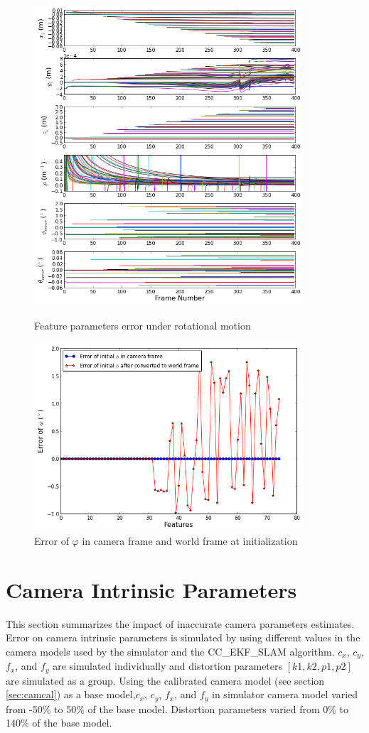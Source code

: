 \begin{figure}[h]
  \centering
  \includegraphics[width=10cm, height=12cm]{./Figures/SimulationFigures/Figure25.png}
  \caption{Feature parameters error under rotational motion}
  \label{fig:simfig25}
\end{figure}

\begin{figure}[h] %
  \centering
  \includegraphics[width=10cm, height=7cm]{./Figures/SimulationFigures/Figure26.png}
  \caption{Error of $\varphi$ in camera frame and world frame at initialization}
  \label{fig:simfig26}
\end{figure}

\FloatBarrier
\section{Camera Intrinsic Parameters}
This section summarizes the impact of inaccurate camera parameters
estimates. Error on camera intrinsic parameters is simulated by using
different values in the camera models used by the simulator and the
CC\_EKF\_SLAM algorithm. $c_{x}$, $c_{y}$, $f_{x}$, and $f_{y}$ are
simulated individually and distortion parameters $[k1, k2, p1, p2]$
are simulated as a group. Using the calibrated camera model (see
section \ref{sec:camcal}) as a base model,$ c_{x}$, $c_{y}$, $f_{x} $,
and $f_{y}$ in simulator camera model varied from -50\% to 50\% of the
base model. Distortion parameters varied from 0\% to 140\% of the base
model.

